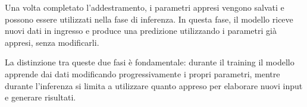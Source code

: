 Una volta completato l'addestramento, i parametri appresi vengono salvati e possono essere utilizzati nella fase di inferenza. In questa fase, il modello riceve nuovi dati in ingresso e produce una predizione utilizzando i parametri già appresi, senza modificarli.

La distinzione tra queste due fasi è fondamentale: durante il training il modello apprende dai dati modificando progressivamente i propri parametri, mentre durante l'inferenza si limita a utilizzare quanto appreso per elaborare nuovi input e generare risultati.
